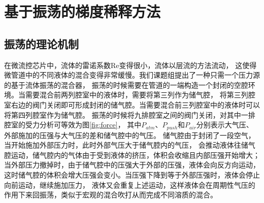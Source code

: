 \section{基于振荡的梯度稀释方法}
\subsection{振荡的理论机制}
	在微流控芯片中，流体的雷诺系数Re变得很小，流体以层流的方法流动，
	这使得微管道中的不同液体的混合变得非常缓慢。我们课题组提出了一种只需一个压力源的基于流体振荡的混合器\cite{cheng2018simple}，
	振荡的时候需要在管道的一端构造一个封闭的空腔环境。当需要混合前两列腔室中的液体时，需要将第三列作为储气腔，
	将第三列腔室右边的阀门关闭即可形成封闭的储气腔。当需要混合前三列腔室中的液体时可以将第四列腔室作为储气腔。
	振荡的时候将九排腔室之间的阀门关闭，对其中一排腔室的受力分析可等效为图\ref{fig:force}，
	其中$P_{atm}$、$P_{push}$和$P_{air}$分别表示大气压、外部施加的压强与大气压的差和储气腔中的气压。
	储气腔由于封闭了一段空气，当开始施加外部压力时，此时外部气压大于储气腔内的气压，
	会推动液体往储气腔运动，储气腔内的气体由于受到液体的挤压，体积会收缩且内部压强开始增大；
	当外部压力撤掉时，由于储气腔中的压强大于外部的压强，液体会向反方向运动，
	这时储气腔的体积会增大压强会变小。当压强下降到等于外部压强时，液体会停止向前运动，继续施加压力，
	液体又会重复上述运动，这样液体会在周期性气压的作用下来回振荡，类似于宏观的混合吹打从而完成不同溶质的混合。
